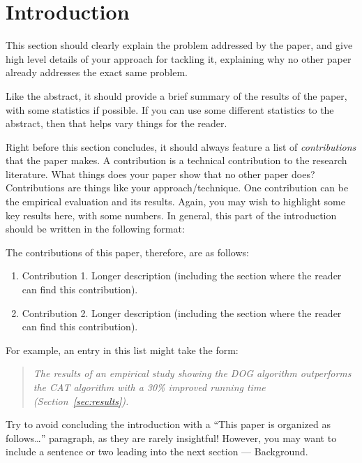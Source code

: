 \section{Introduction}
\label{sec:introduction}

%


This section should clearly explain the problem addressed 
by the paper, and give high level details of your approach
for tackling it, explaining why no other paper already
addresses the exact same problem.

Like the abstract, it should provide a brief summary of 
the results of the paper, with some statistics if possible. 
If you can use some different statistics to the 
abstract, then that helps vary things for the reader.

Right before this section concludes, it should always
feature a list of {\em contributions} that the paper makes.
A contribution is a technical contribution to the 
research literature. What things does your paper show
that no other paper does? Contributions are things 
like your approach/technique. 
One contribution can be the empirical evaluation and
its results. Again, you may wish to highlight some 
key results here, with some numbers. In general, this
part of the introduction should be written in the following
format:

The contributions of this paper, therefore, are as follows:

\begin{enumerate}

    \item Contribution 1. Longer description
    (including the section where the reader can find this 
    contribution).
    
    \item Contribution 2. Longer description
    (including the section where the reader can find this 
    contribution).

\end{enumerate}    

For example, an entry in this list might take the form:
\begin{quote} \it
    The results of an empirical study showing the DOG
    algorithm outperforms the CAT algorithm with
    a 30\% improved running time (Section~\ref{sec:results}).
\end{quote}

Try to avoid concluding the introduction with a 
``This paper is organized as follows\ldots'' paragraph,
as they are rarely insightful! 
%
However, you may want to include a sentence or two 
leading into the next section --- Background.